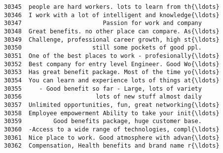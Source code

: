 \documentclass[11pt]{article}
\begin{document}
\begin{tcolorbox}[breakable, boxrule=.5pt, size=fbox, pad at break*=1mm, opacityfill=0]
\begin{Verbatim}[commandchars=\\\{\}]
30345  people are hard workers. lots to learn from th{\ldots}
30346  I work with a lot of intelligent and knowledge{\ldots}
30347                       Passion for work and company
30348  Great benefits. no other place can compare. As{\ldots}
30349  Challenge, professional career growth, high st{\ldots}
30350                    still some pockets of good ppl.
30351  One of the best places to work - profesionally{\ldots}
30352  Best company for entry level Engineer. Good Wo{\ldots}
30353  Has great benefit package. Most of the time yo{\ldots}
30354  You can learn and experience lots of things at{\ldots}
30355     - Good benefit so far - Large, lots of variety
30356                     lots of new stuff almost daily
30357  Unlimited opportunities, fun, great networking{\ldots}
30358  Employee empowerment Ability to take your init{\ldots}
30359         Good benefits package, huge customer base.
30360  -Access to a wide range of technologies, compl{\ldots}
30361  Nice place to work. Good atmosphere with advan{\ldots}
30362  Compensation, Health benefits and brand name r{\ldots}


\end{Verbatim}
\end{tcolorbox}
\end{document}
